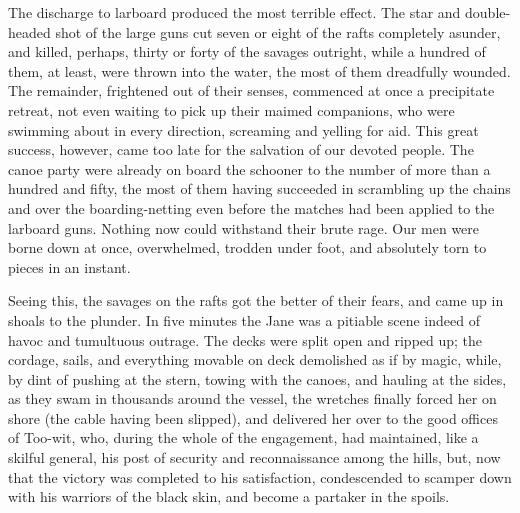 The discharge to larboard produced the most terrible effect. The star and
double-headed shot of the large guns cut seven or eight of the rafts completely
asunder, and killed, perhaps, thirty or forty of the savages outright, while a
hundred of them, at least, were thrown into the water, the most of them
dreadfully wounded. The remainder, frightened out of their senses, commenced at
once a precipitate retreat, not even waiting to pick up their maimed companions,
who were swimming about in every direction, screaming and yelling for aid. This
great success, however, came too late for the salvation of our devoted people.
The canoe party were already on board the schooner to the number of more than a
hundred and fifty, the most of them having succeeded in scrambling up the chains
and over the boarding-netting even before the matches had been applied to the
larboard guns. Nothing now could withstand their brute rage. Our men were borne
down at once, overwhelmed, trodden under foot, and absolutely torn to pieces in
an instant. 

Seeing this, the savages on the rafts got the better of their fears, and came
up in shoals to the plunder. In five minutes the Jane was a pitiable scene
indeed of havoc and tumultuous outrage. The decks were split open and ripped up;
the cordage, sails, and everything movable on deck demolished as if by magic,
while, by dint of pushing at the stern, towing with the canoes, and hauling at
the sides, as they swam in thousands around the vessel, the wretches finally
forced her on shore (the cable having been slipped), and delivered her over to
the good offices of Too-wit, who, during the whole of the engagement, had
maintained, like a skilful general, his post of security and reconnaissance
among the hills, but, now that the victory was completed to his satisfaction,
condescended to scamper down with his warriors of the black skin, and become a
partaker in the spoils. 

